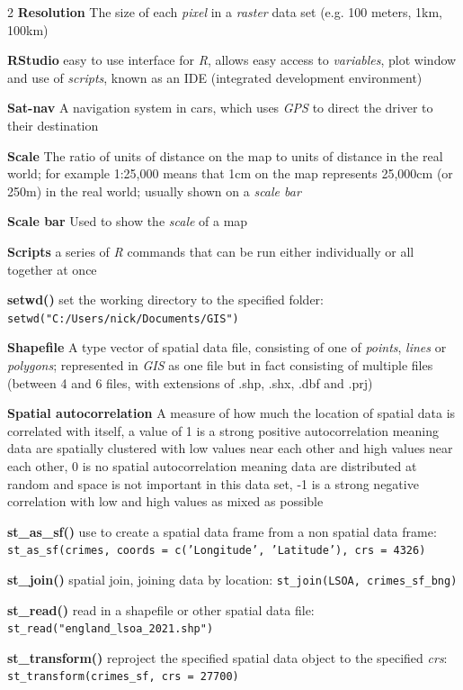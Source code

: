 \documentclass[a4paper,10pt]{article}
\begin{document}
\begin{multicols}{2}
\textbf{Resolution} The size of each \textit{pixel} in a \textit{raster} data set (e.g. 100 meters, 1km, 100km)

\textbf{RStudio} easy to use interface for \textit{R}, allows easy access to \textit{variables}, plot window and use of \textit{scripts}, known as an IDE (integrated development environment)

\textbf{Sat-nav} A navigation system in cars, which uses \textit{GPS} to direct the driver to their destination

\textbf{Scale} The ratio of units of distance on the map to units of distance in the real world; for example 1:25,000 means that 1cm on the map represents 25,000cm (or 250m) in the real world; usually shown on a \textit{scale bar}

\textbf{Scale bar} Used to show the \textit{scale} of a map

\textbf{Scripts} a series of \textit{R} commands that can be run either individually or all together at once

\textbf{setwd()} set the working directory to the specified folder: \texttt{setwd("C:/Users/nick/Documents/GIS")}

\textbf{Shapefile} A type vector of spatial data file, consisting of one of \textit{points}, \textit{lines} or \textit{polygons}; represented in \textit{GIS} as one file but in fact consisting of multiple files (between 4 and 6 files, with extensions of .shp, .shx, .dbf and .prj)

\textbf{Spatial autocorrelation} A measure of how much the location of spatial data is correlated with itself, a value of 1 is a strong positive autocorrelation meaning data are spatially clustered with low values near each other and high values near each other, 0 is no spatial autocorrelation meaning data are distributed at random and space is not important in this data set, -1 is a strong negative correlation with low and high values as mixed as possible

\textbf{st\_as\_sf()} use to create a spatial data frame from a non spatial data frame: \texttt{st\_as\_sf(crimes, coords = c('Longitude', 'Latitude'), crs = 4326)}

\textbf{st\_join()} spatial join, joining data by location: \texttt{st\_join(LSOA, crimes\_sf\_bng)}

\textbf{st\_read()} read in a shapefile or other spatial data file: \texttt{st\_read("england\_lsoa\_2021.shp")}

\textbf{st\_transform()} reproject the specified spatial data object to the specified \textit{crs}: \texttt{st\_transform(crimes\_sf, crs = 27700)}


\end{multicols}
\end{document}
